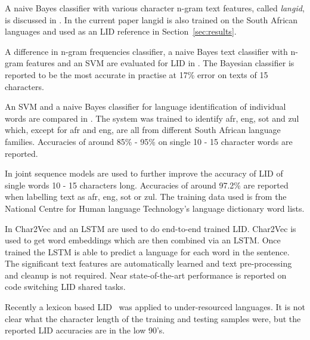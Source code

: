 \documentclass[conference]{IEEEtran}
\begin{document}
A naive Bayes classifier with various character n-gram text features, called \emph{langid}, is discussed in \cite{LuiBaldwin2012}. In the current paper langid is also trained on the South African languages and used as an LID reference in Section~\ref{sec:results}.

A difference in n-gram frequencies classifier, a naive Bayes text classifier with n-gram features and an SVM are evaluated for LID in \cite{BothaBarnard2012}. The Bayesian classifier is reported to be the most accurate in practise at 17\% error on texts of 15 characters. 

An SVM and a naive Bayes classifier for language identification of individual words are compared in \cite{GiwaDavel2013}. The system was trained to identify afr, eng, sot and zul which, except for afr and eng, are all from different South African language families. Accuracies of around 85\% - 95\% on single 10 - 15 character words are reported.


In \cite{GiwaDavel2014} joint sequence models are used to further improve the accuracy of LID of single words 10 - 15 characters long. Accuracies of around 97.2\% are reported when labelling text as afr, eng, sot or zul. The training data used is from the National Centre for Human language Technology's language dictionary word lists.

In \cite{JaechEtAl2016} Char2Vec and an LSTM are used to do end-to-end trained LID. Char2Vec is used to get word embeddings which are then combined via an LSTM. Once trained the LSTM is able to predict a language for each word in the sentence. The significant text features are automatically learned and text pre-processing and cleanup is not required. Near state-of-the-art performance is reported on code switching LID shared tasks.

Recently a lexicon based LID~\cite{SelamatAkosu2016} was applied to under-resourced languages. It is not clear what the character length of the training and testing samples were, but the reported LID accuracies are in the low 90's.
\end{document}
